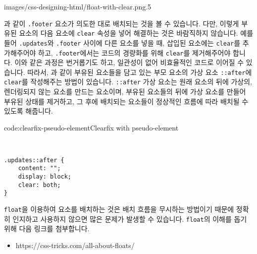     {images/css-designing-html/float-with-clear.png}{.5}

과 같이 \verb|.footer| 요소가 의도한 대로 배치되는 것을 볼 수 있습니다. 다만, 이렇게 부유된 요소의 다음 요소에 \verb|clear| 속성을 넣어 해결하는 것은 바람직하지 않습니다. 예를 들어 \verb|.updates|와 \verb|.footer| 사이에 다른 요소를 넣을 때, 삽입된 요소에는 \verb|clear|를 추가해주어야 하고, \verb|.footer|에서는 코드의 경량화를 위해 \verb|clear|를 제거해주어야 합니다. 이와 같은 과정은 번거롭기도 하고, 일관성이 없어 비효율적인 코드로 이어질 수 있습니다. 따라서, 과 같이 부유된 요소들을 담고 있는 부모 요소의 가상 요소 \verb|::after|에 \verb|clear|를 작성해주는 방법이 있습니다. \verb|::after| 가상 요소는 원래 요소의 뒤에 가상의, 렌더링되지 않는 요소를 만드는 요소이며, 부유된 요소들의 뒤에 가상 요소를 만들어 부유된 상태를 제거하고, 그 후에 배치되는 요소들이 정상적인 흐름에 따라 배치될 수 있도록 해줍니다. 

\begin{codeenv}{code:clearfix-pseudo-element}{Clearfix with pseudo-element}\begin{verbatim}


.updates::after {
    content: "";
    display: block;
    clear: both;
}
\end{verbatim}
\end{codeenv}

\verb|float|을 이용하여 요소를 배치하는 것은 배치 흐름을 무시하는 방법이기 때문에 정확히 인지하고 사용하지 않으면 많은 문제가 발생할 수 있습니다. \verb|float|의 이해를 돕기 위해 다음 링크를 첨부합니다. 

\begin{itemize}
    \item https://css-tricks.com/all-about-floats/
\end{itemize}
